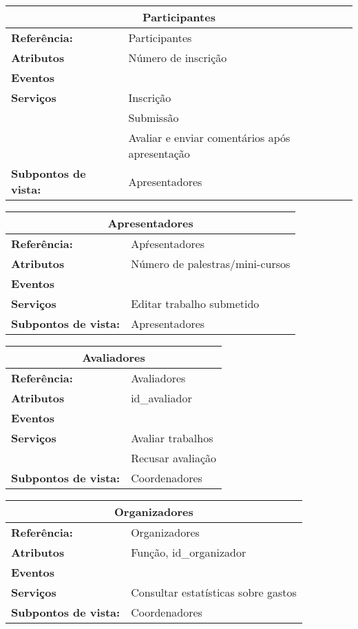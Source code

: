 \documentclass[letter]{article}
\begin{document}
\begin{center}

\begin{table}[h!]

\begin{center}
\begin{tabular}{|ll|}
\hline 
\multicolumn{2}{|c|}{\textbf{Participantes}}\tabularnewline
\hline
\textbf{Referência:} & Participantes\tabularnewline
\textbf{Atributos} & Número de inscrição\tabularnewline
\textbf{Eventos} & \tabularnewline
\textbf{Serviços} & Inscrição\tabularnewline
 & Submissão\tabularnewline
 & Avaliar e enviar comentários após apresentação\tabularnewline
\textbf{Subpontos de vista:} & Apresentadores \tabularnewline
\hline
\end{tabular}
\end{center}
\end{table}


%
\begin{table}[h!]


\begin{center}
\begin{tabular}{|ll|}
\hline 
\multicolumn{2}{|c|}{\textbf{Apresentadores}}\tabularnewline
\hline
\textbf{Referência:} & Ap\'{r}esentadores\tabularnewline
\textbf{Atributos} & Número de palestras/mini-cursos\tabularnewline
\textbf{Eventos} & \tabularnewline
\textbf{Serviços} & Editar trabalho submetido\tabularnewline
\textbf{Subpontos de vista:} & Apresentadores \tabularnewline
\hline
\end{tabular}

\end{center}
\end{table}


%
\begin{table}[h!]
\begin{center}
\begin{tabular}{|ll|}
\hline 
\multicolumn{2}{|c|}{\textbf{Avaliadores}}\tabularnewline
\hline
\textbf{Referência:} & Avaliadores\tabularnewline
\textbf{Atributos} & id\_avaliador\tabularnewline
\textbf{Eventos} & \tabularnewline
\textbf{Serviços} & Avaliar trabalhos\tabularnewline
 & Recusar avaliação\tabularnewline
\textbf{Subpontos de vista:} & Coordenadores\tabularnewline
\hline
\end{tabular}
\end{center}
\end{table}
%
\newpage
\begin{table}[h!]
\begin{center}
\begin{tabular}{|ll|}
\hline 
\multicolumn{2}{|c|}{\textbf{Organizadores}}\tabularnewline
\hline
\textbf{Referência:} & Organizadores\tabularnewline
\textbf{Atributos} & Função, id\_organizador\tabularnewline
\textbf{Eventos} & \tabularnewline
\textbf{Serviços} & Consultar estatísticas sobre gastos\tabularnewline
\textbf{Subpontos de vista:} & Coordenadores\tabularnewline
\hline
\end{tabular}
\end{center}
\end{table}



\end{center}
\end{document}
